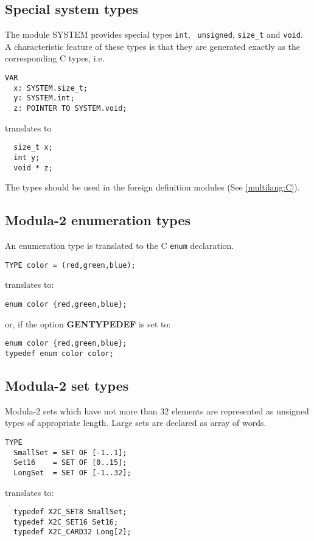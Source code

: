 \subsection{Special system types}

The module SYSTEM provides special types {\tt int}, {\tt
unsigned}, \verb|size_t| and {\tt void}. A characteristic feature
of these types is that they are generated exactly as
the corresponding C types, i.e.
\begin{verbatim}
VAR
  x: SYSTEM.size_t;
  y: SYSTEM.int;
  z: POINTER TO SYSTEM.void;
\end{verbatim}
translates to
\begin{verbatim}
  size_t x;
  int y;
  void * z;
\end{verbatim}
The types should be used in the foreign definition modules
(See \ref{multilang:C}).

\subsection{Modula-2 enumeration types}

An enumeration type is translated to the C {\tt enum} declaration.
\begin{verbatim}
TYPE color = (red,green,blue);
\end{verbatim}
translates to:
\begin{verbatim}
enum color {red,green,blue};
\end{verbatim}
or, if the option {\bf GENTYPEDEF} is set to:
\begin{verbatim}
enum color {red,green,blue};
typedef enum color color;
\end{verbatim}

\subsection{Modula-2 set types}

Modula-2 sets which have not more than 32 elements are represented
as unsigned types of appropriate length. Large sets are declared
as array of words.
\begin{verbatim}
TYPE
  SmallSet = SET OF [-1..1];
  Set16    = SET OF [0..15];
  LongSet  = SET OF [-1..32];
\end{verbatim}
translates to:
\begin{verbatim}
  typedef X2C_SET8 SmallSet;
  typedef X2C_SET16 Set16;
  typedef X2C_CARD32 Long[2];
\end{verbatim}

